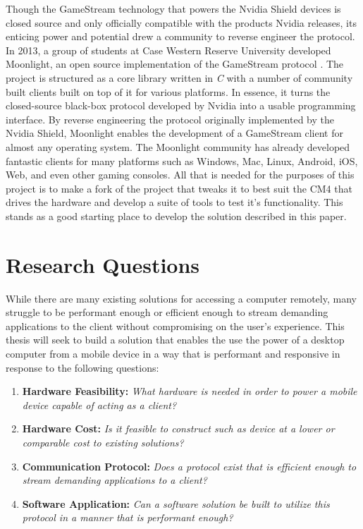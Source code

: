 Though the GameStream technology that powers the Nvidia Shield devices is closed source and only officially compatible with the products Nvidia releases, its enticing power and potential drew a community to reverse engineer the protocol.
In 2013, a group of students at Case Western Reserve University developed Moonlight, an open source implementation of the GameStream protocol \cite{moonlight}.
The project is structured as a core library written in \emph{C} with a number of community built clients built on top of it for various platforms.
In essence, it turns the closed-source black-box protocol developed by Nvidia into a usable programming interface.
By reverse engineering the protocol originally implemented by the Nvidia Shield, Moonlight enables the development of a GameStream client for almost any operating system.
The Moonlight community has already developed fantastic clients for many platforms such as Windows, Mac, Linux, Android, iOS, Web, and even other gaming consoles.
All that is needed for the purposes of this project is to make a fork of the project that tweaks it to best suit the CM4 that drives the hardware and develop a suite of tools to test it's functionality.
This stands as a good starting place to develop the solution described in this paper.

\section{Research Questions}\label{sec:ResearchQuestions}

While there are many existing solutions for accessing a computer remotely, many struggle to be performant enough or efficient enough to stream demanding applications to the client without compromising on the user's experience.
This thesis will seek to build a solution that enables the use the power of a desktop computer from a mobile device in a way that is performant and responsive in response to the following questions:

\begin{enumerate}
  \item \textbf{Hardware Feasibility:} \emph{What hardware is needed in order to power a mobile device capable of acting as a client?}
  \item \textbf{Hardware Cost:} \emph{Is it feasible to construct such as device at a lower or comparable cost to existing solutions?}
  \item \textbf{Communication Protocol:} \emph{Does a protocol exist that is efficient enough to stream demanding applications to a client?}
  \item \textbf{Software Application:} \emph{Can a software solution be built to utilize this protocol in a manner that is performant enough?}
\end{enumerate}